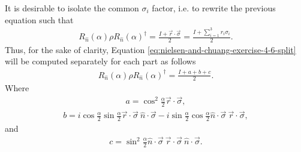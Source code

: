 It is desirable to isolate the common $\sigma_i$ factor,
i.e. to rewrite the previous equation such that
\begin{align}
    R_{\hat n}(\alpha) \rho R_{\hat n}(\alpha)^\dagger =
    \frac{I + \vec{r}\cdot\vec{\sigma}}{2} =
    \frac{I + \sum_{i = 1}^3 r_i \sigma_i}{2}.
\end{align}
Thus, for the sake of clarity, Equation \ref{eq:nielsen-and-chuang-exercise-4-6-split}
will be computed separately for each part as follows
\begin{align}
    R_{\hat n}(\alpha) \rho R_{\hat n}(\alpha)^\dagger = 
    \frac{I + a + b + c}{2}.
\end{align}
Where
\begin{align}
    a = \cos^2 \frac{\alpha}{2} \vec{r}\cdot\vec{\sigma},
    \label{eq:nielsen-and-chuang-exercise-4-6-a}
\end{align}
\begin{align}
    b = i \cos\frac{\alpha}{2}\sin\frac{\alpha}{2} \vec{r} \cdot\vec{\sigma}
        \ \hat{n}\cdot\vec{\sigma} -
        i \sin\frac{\alpha}{2}\cos\frac{\alpha}{2} \hat{n}\cdot\vec{\sigma}
        \ \vec{r}\cdot\vec{\sigma},
    \label{eq:nielsen-and-chuang-exercise-4-6-b}
\end{align}
and
\begin{align}
    c = \sin^2\frac{\alpha}{2} \hat{n}\cdot\vec{\sigma}\
        \vec{r}\cdot\vec{\sigma}\ \hat{n}\cdot\vec{\sigma} .
    \label{eq:nielsen-and-chuang-exercise-4-6-c}
\end{align}

